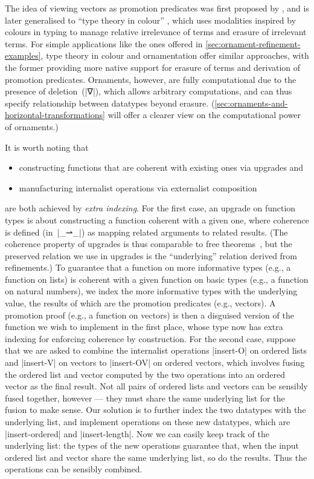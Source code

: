 The idea of viewing vectors as promotion predicates was first proposed by \citet[page~82]{Bernardy-thesis}, and is later generalised to ``type theory in colour'' \citep{Bernardy-color}, which uses modalities inspired by colours in typing to manage relative irrelevance of terms and erasure of irrelevant terms.
For simple applications like the ones offered in \autoref{sec:ornament-refinement-examples}, type theory in colour and ornamentation offer similar approaches, with the former providing more native support for erasure of terms and derivation of promotion predicates.
Ornaments, however, are fully computational due to the presence of deletion~(|∇|), which allows arbitrary computations, and can thus specify relationship between datatypes beyond erasure.
(\autoref{sec:ornaments-and-horizontal-transformations} will offer a clearer view on the computational power of ornaments.)

It is worth noting that
\begin{itemize}
\item constructing functions that are coherent with existing ones via upgrades and
\item manufacturing internalist operations via externalist composition
\end{itemize}
are both achieved by \emph{extra indexing}.
For the first case, an upgrade on function types is about constructing a function coherent with a given one, where coherence is defined (in~|_⇀_|) as mapping related arguments to related results. (The coherence property of upgrades is thus comparable to free theorems~\citep{Wadler-theorems-for-free}, but the preserved relation we use in upgrades is the ``underlying'' relation derived from refinements.)
To guarantee that a function on more informative types (e.g., a function on lists) is coherent with a given function on basic types (e.g., a function on natural numbers), we index the more informative types with the underlying value, the results of which are the promotion predicates (e.g., vectors).
A promotion proof (e.g., a function on vectors) is then a disguised version of the function we wish to implement in the first place, whose type now has extra indexing for enforcing coherence by construction.
For the second case, suppose that we are asked to combine the internalist operations |insert-O| on ordered lists and |insert-V| on vectors to |insert-OV| on ordered vectors, which involves fusing the ordered list and vector computed by the two operations into an ordered vector as the final result.
Not all pairs of ordered lists and vectors can be sensibly fused together, however --- they must share the same underlying list for the fusion to make sense.
Our solution is to further index the two datatypes with the underlying list, and implement operations on these new datatypes, which are |insert-ordered| and |insert-length|.
Now we can easily keep track of the underlying list: the types of the new operations guarantee that, when the input ordered list and vector share the same underlying list, so do the results.
Thus the operations can be sensibly combined.

